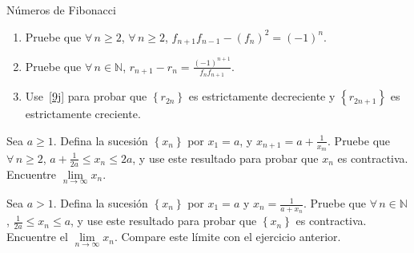 \begin{prob}{Números de Fibonacci}
\begin{enumerate}
			Los matemáticos de la Grecia clásica llamaron esta proporción $R=\frac{a}{b}$ la ``\textbf{Proporción áurea}'' y cualquier rectángulo con lados en la proporción un ``\textbf{rectángulo áureo}''. Ellos consideraron esto como la más estéticamente agradable de todos los rectángulos, y se usó esto frecuentemente en su arte y arquitectura. Pruebe algebraicamente que $R=\alpha$, definida en~\ref{9f} arriba.
			\item Pruebe que $\forall\,n\geq2$, $\forall\,n\geq2$, $f_{n+1}f_{n-1}-{\left(f_{n}\right)}^{2}={\left(-1\right)}^{n}$.
			\item Pruebe que $\forall\,n\in\mathds{N}$, $r_{n+1}-r_{n}=\frac{{\left(-1\right)}^{n+1}}{f_{n}f_{n+1}}$.\label{9j}
			\item Use~\ref{9j} para probar que $\left\{r_{2n}\right\}$ es estrictamente decreciente y $\left\{r_{2n+1}\right\}$ es estrictamente creciente.
	\end{enumerate}
\end{prob}

\begin{solution}
	
\end{solution}

\begin{prob}{}
	Sea $a\geq1$. Defina la sucesión $\left\{x_{n}\right\}$ por $x_{1}=a$, y $x_{n+1}=a+\frac{1}{x_{m}}$. Pruebe que $\forall\,n\geq2$, $a+\frac{1}{2a}\leq x_{n}\leq 2a$, y use este resultado para probar que $x_{n}$ es contractiva. Encuentre $\lim\limits_{n\to\infty}x_{n}$.
\end{prob}

\begin{solution}
	
\end{solution}

\begin{prob}{}
	Sea $a>1$. Defina la sucesión $\left\{x_{n}\right\}$ por $x_{1}=a$ y $x_{n}=\frac{1}{a+x_{n}}$. Pruebe que $\forall\,n\in\mathds{N}$, $\frac{1}{2a}\leq x_{n}\leq a$, y use este resultado para probar que $\left\{x_{n}\right\}$ es contractiva. Encuentre el $\lim\limits_{n\to\infty}x_{n}$. Compare este límite con el ejercicio anterior.
\end{prob}

\begin{solution}
	
\end{solution}